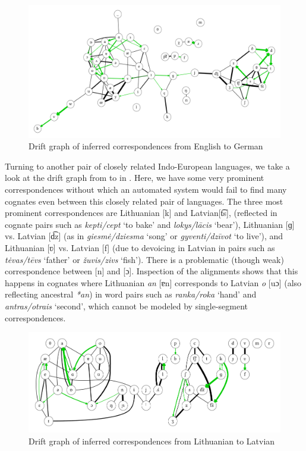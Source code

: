 \begin{figure}
\includegraphics[width=\textwidth]{figures/drift-graph-en-de.pdf}
\caption{Drift graph of inferred correspondences from English to German}
\label{fig:driftGraphEnDe}
\end{figure}

Turning to another pair of closely related Indo-European languages, we take a look at the drift graph from  to  in . Here, we have some very prominent correspondences without which an automated system would fail to find many cognates even between this closely related pair of languages. The three most prominent correspondences are Lithuanian [k] and Latvian[t͡s], (reflected in cognate pairs such as \textit{kepti/cept} `to bake' and \textit{lokys/l\={a}cis} `bear'), Lithuanian [ɡ] vs. Latvian [d͡z] (as in \textit{giesm\.{e}/dziesma} `song' or \textit{gyventi/dz\=ivot} `to live'), and Lithuanian [ʋ] vs. Latvian [f] (due to devoicing in Latvian in pairs such as \textit{t\.{e}vas/t\={e}vs} `father' or \textit{\v{z}uvis/zivs} `fish'). There is a problematic (though weak) correspondence between [n] and [ɔ]. Inspection of the alignments shows that this happens in cognates where Lithuanian \textit{an} [ɐn] corresponds to Latvian \textit{o} [uɔ] (also reflecting ancestral \textit{*an}) in word pairs such as \textit{ranka/roka} `hand' and \textit{antras/otrais} `second', which cannot be modeled by single-segment correspondences.

\begin{figure}
\includegraphics[width=\textwidth]{figures/drift-graph-lt-lv.pdf}
\caption{Drift graph of inferred correspondences from Lithuanian to Latvian}
\label{fig:driftGraphLtLv}
\end{figure}

